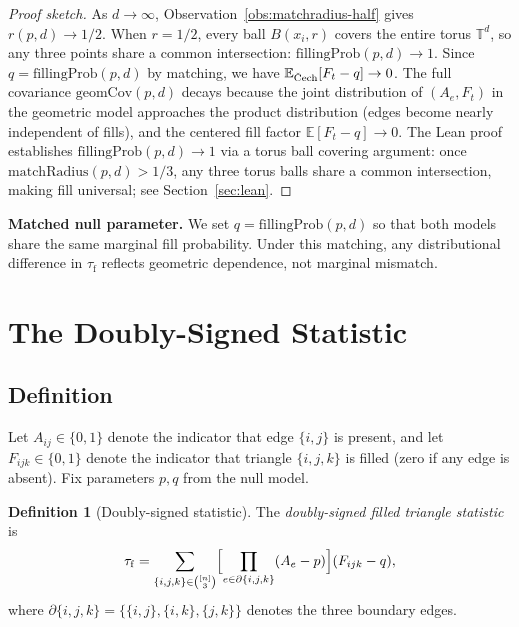 \documentclass[reqno,12pt]{amsart}
\newcommand{\tauf}{\tau_{\mathrm{f}}}
\newcommand{\Cech}{\ifmmode\text{\v{C}ech}\else\v{C}ech\fi}  %
\newcommand{\geomCov}{\mathrm{geomCov}}
\newcommand{\fillingP}{\mathrm{fillingProb}}
\newcommand{\matchR}{\mathrm{matchRadius}}
\newcommand{\TT}{\mathbb{T}}         %
\newcommand{\EE}{\mathbb{E}}
\theoremstyle{plain}
\theoremstyle{definition}
\newtheorem{definition}[theorem]{Definition}
\theoremstyle{remark}
\begin{document}
\begin{proof}[Proof sketch]
As $d\to\infty$, Observation~\ref{obs:matchradius-half} gives $r(p,d)\to 1/2$. When
$r = 1/2$, every ball $B(x_i, r)$ covers the entire torus $\TT^d$, so any three points share
a common intersection: $\fillingP(p,d)\to 1$. Since $q = \fillingP(p,d)$ by matching, we have
$\EE_{\Cech}[F_t - q]\to 0$. The full covariance $\geomCov(p,d)$ decays because the joint
distribution of $(A_e, F_t)$ in the geometric model approaches the product distribution (edges
become nearly independent of fills), and the centered fill factor $\EE[F_t - q]\to 0$. The
Lean proof establishes $\fillingP(p,d)\to 1$ via a torus ball covering argument: once
$\matchR(p,d) > 1/3$, any three torus balls share a common intersection, making fill
universal; see Section~\ref{sec:lean}.
\end{proof}

\textbf{Matched null parameter.} We set $q = \fillingP(p,d)$ so that both models share the
same marginal fill probability. Under this matching, any distributional difference in $\tauf$
reflects geometric dependence, not marginal mismatch.

\section{The Doubly-Signed Statistic}\label{sec:statistic}

\subsection{Definition}

Let $A_{ij}\in\{0,1\}$ denote the indicator that edge $\{i,j\}$ is present, and let
$F_{ijk}\in\{0,1\}$ denote the indicator that triangle $\{i,j,k\}$ is filled (zero if any
edge is absent). Fix parameters $p,q$ from the null model.

\begin{definition}[Doubly-signed statistic]\label{def:tauf}
The \emph{doubly-signed filled triangle statistic} is
\begin{equation}\label{eq:tauf-def}
  \tauf = \sum_{\{i,j,k\}\in\binom{[n]}{3}}
    \Bigl[\prod_{e\in\partial\{i,j,k\}}(A_e - p)\Bigr](F_{ijk} - q),
\end{equation}
where $\partial\{i,j,k\} = \bigl\{\{i,j\},\{i,k\},\{j,k\}\bigr\}$ denotes the three
boundary edges.
\end{definition}
\end{document}
